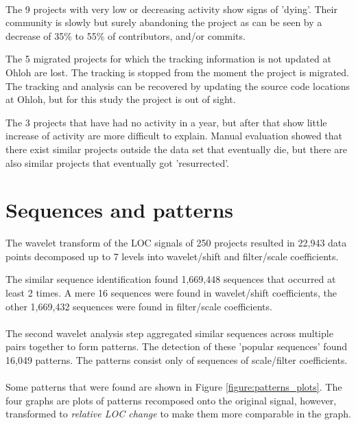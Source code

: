 \paragraph{}
The 9 projects with very low or decreasing activity show signs of 'dying'. Their
community is slowly but surely abandoning the project as can be seen by a
decrease of 35\% to 55\% of contributors, and/or commits.

The 5 migrated projects for which the tracking information is not updated at
Ohloh are lost. The tracking is stopped from the moment the project is
migrated. The tracking and analysis can be recovered by updating the source
code locations at Ohloh, but for this study the project is out of sight.

The 3 projects that have had no activity in a year, but after that show little
increase of activity are more difficult to explain. Manual evaluation showed
that there exist similar projects outside the data set that eventually die, but
there are also similar projects that eventually got 'resurrected'.



\section{Sequences and patterns}
\label{section:seqs_patterns}
The wavelet transform of the LOC signals of 250 projects resulted in 22,943
data points decomposed up to 7 levels into wavelet/shift and filter/scale
coefficients.

The similar sequence identification found 1,669,448 sequences that occurred
at least 2 times. A mere 16 sequences were found in wavelet/shift coefficients,
the other 1,669,432 sequences were found in filter/scale coefficients.

\paragraph{}
The second wavelet analysis step aggregated similar sequences across multiple
pairs together to form patterns. The detection of these 'popular sequences'
found 16,049 patterns. The patterns consist only of sequences of scale/filter
coefficients.

\paragraph{}
Some patterns that were found are shown in Figure \ref{figure:patterns_plots}.
The four graphs are plots of patterns recomposed onto the original signal,
however, transformed to \emph{relative LOC change }\rm to make them more
comparable in the graph.

